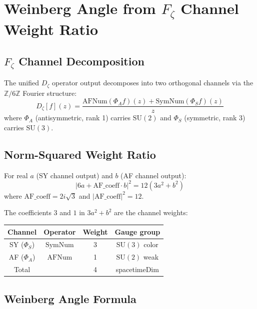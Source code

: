 \chapter{Weinberg Angle from \texorpdfstring{$F_\zeta$}{Fζ} Channel Weight Ratio}
\label{chap:pd_weinberg}

\section{\texorpdfstring{$F_\zeta$}{Fζ} Channel Decomposition}
\label{sec:weinberg_channel}

The unified $D_\zeta$ operator output decomposes into two orthogonal channels
via the $\mathbb{Z}/6\mathbb{Z}$ Fourier structure:
\[
D_\zeta[f](z) = \frac{\mathrm{AFNum}(\Phi_A f)(z) + \mathrm{SymNum}(\Phi_S f)(z)}{z}
\]
where $\Phi_A$ (antisymmetric, rank 1) carries $\mathrm{SU}(2)$ and
$\Phi_S$ (symmetric, rank 3) carries $\mathrm{SU}(3)$.

\section{Norm-Squared Weight Ratio}
\label{sec:weinberg_normSq}

\begin{theorem}
\label{thm:weinberg_normSq}
\leanok
For real $a$ (SY channel output) and $b$ (AF channel output):
\[
|6a + \mathrm{AF\_coeff} \cdot b|^2 = 12(3a^2 + b^2)
\]
where $\mathrm{AF\_coeff} = 2i\sqrt{3}$ and $|\mathrm{AF\_coeff}|^2 = 12$.
\end{theorem}

The coefficients $3$ and $1$ in $3a^2 + b^2$ are the channel weights:
\begin{center}
\begin{tabular}{|c|c|c|c|}
\hline
Channel & Operator & Weight & Gauge group \\
\hline
SY ($\Phi_S$) & $\mathrm{SymNum}$ & 3 & $\mathrm{SU}(3)$ color \\
AF ($\Phi_A$) & $\mathrm{AFNum}$ & 1 & $\mathrm{SU}(2)$ weak \\
\hline
Total & & 4 & spacetimeDim \\
\hline
\end{tabular}
\end{center}

\section{Weinberg Angle Formula}
\label{sec:weinberg_formula}

